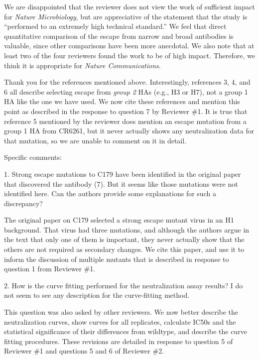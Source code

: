 \documentclass[11pt, oneside]{article}   	%
\begin{document}
{\color{black}
We are disappointed that the reviewer does not view the work of sufficient impact for \textit{Nature Microbiology}, but are appreciative of the statement that the study is ``performed to an extremely high technical standard.''
We feel that direct quantitative comparison of the escape from narrow and broad antibodies is valuable, since other comparisons have been more anecdotal.
We also note that at least two of the four reviewers found the work to be of high impact.
Therefore, we think it is appropriate for \textit{Nature Communications}.

Thank you for the references mentioned above. 
Interestingly, references 3, 4, and 6 all describe selecting escape from \emph{group 2} HAs (e.g., H3 or H7), not a group 1 HA like the one we have used.
We now cite these references and mention this point as described in the response to question 7 by Reviewer \#1.
It is true that reference 5 mentioned by the reviewer does mention an escape mutation from a group 1 HA from CR6261, but it never actually shows any neutralization data for that mutation, so we are unable to comment on it in detail.
}

Specific comments:

1.  Strong escape mutations to C179 have been identified in the original paper that discovered the antibody (7). But it seems like those mutations were not identified here. Can the authors provide some explanations for such a discrepancy?

{\color{black}
The original paper on C179 selected a strong escape mutant virus in an H1 background.
That virus had three mutations, and although the authors argue in the text that only one of them is important, they never actually show that the others are not required as secondary changes.
We cite this paper, and use it to inform the discussion of multiple mutants that is described in response to question 1 from Reviewer \#1.
}

2.  How is the curve fitting performed for the neutralization assay results? I do not seem to see any description for the curve-fitting method. 

{
\color{black}
This question was also asked by other reviewers.
We now better describe the neutralization curves, show curves for all replicates, calculate IC50s and the statistical significance of their differences from wildtype, and describe the curve fitting procedures.
These revisions are detailed in response to question 5 of Reviewer \#1 and questions 5 and 6 of Reviewer \#2.}
\end{document}
